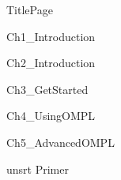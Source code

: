 \documentclass [letterpaper]{report}
\begin{document}
\fancyhf{} %
\renewcommand{\chaptermark}[1]{\markboth{\chaptername\ \thechapter.\ #1}{}}
\fancyhead[C]{\leftmark}

 {TitlePage}

\newpage
{}
\tableofcontents

\newpage
{}

 {Ch1_Introduction}

 {Ch2_Introduction}

 {Ch3_GetStarted}

 {Ch4_UsingOMPL}

 {Ch5_AdvancedOMPL}

 {unsrt}
 {Primer}
\end{document}
